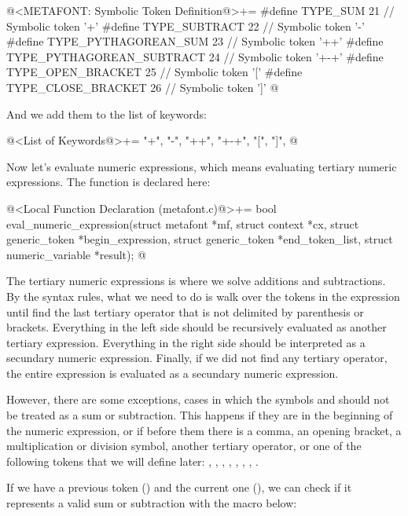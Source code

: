 \iniciocodigo
@<METAFONT: Symbolic Token Definition@>+=
#define TYPE_SUM                   21 // Symbolic token '+'
#define TYPE_SUBTRACT              22 // Symbolic token '-'
#define TYPE_PYTHAGOREAN_SUM       23 // Symbolic token '++'
#define TYPE_PYTHAGOREAN_SUBTRACT  24 // Symbolic token '+-+'
#define TYPE_OPEN_BRACKET          25 // Symbolic token '['
#define TYPE_CLOSE_BRACKET         26 // Symbolic token ']'
@
\fimcodigo

And we add them to the list of keywords:

\iniciocodigo
@<List of Keywords@>+=
"+", "-", "++", "+-+", "[", "]",
@
\fimcodigo

Now let's evaluate numeric expressions, which means evaluating
tertiary numeric expressions. The function is declared here:

\iniciocodigo
@<Local Function Declaration (metafont.c)@>+=
bool eval_numeric_expression(struct metafont *mf, struct context *cx,
                             struct generic_token *begin_expression,
                             struct generic_token *end_token_list,
                             struct numeric_variable *result);
@
\fimcodigo

The tertiary numeric expressions is where we solve additions and
subtractions. By the syntax rules, what we need to do is walk over the
tokens in the expression until find the last tertiary operator that is
not delimited by parenthesis or brackets. Everything in the left side
should be recursively evaluated as another tertiary
expression. Everything in the right side should be interpreted as a
secundary numeric expression. Finally, if we did not find any tertiary
operator, the entire expression is evaluated as a secundary numeric
expression.

However, there are some exceptions, cases in which the
symbols \monoespaco{+} and \monoespaco{-} should not be treated as a
sum or subtraction. This happens if they are in the beginning of the
numeric expression, or if before them there is a comma, an opening
bracket, a multiplication or division symbol, another tertiary
operator, or one of the following tokens that we will define later:
, , ,
, , ,
,  .


If we have a previous token () and the current one
(), we can check if it represents a valid sum or
subtraction with the macro below:

